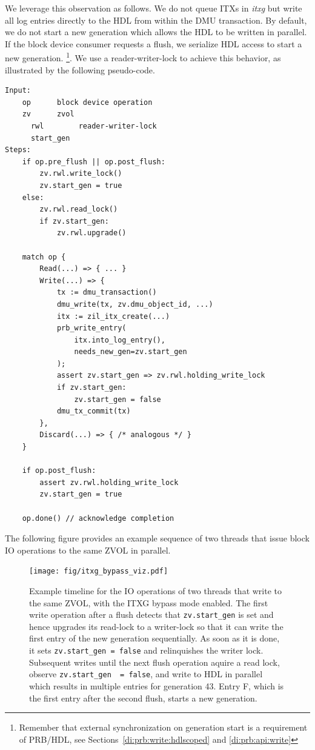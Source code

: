 \documentclass[12pt,a4paper,twoside]{book}
\begin{document}
We leverage this observation as follows.
We do not queue ITXs in \textit{itxg} but write all log entries directly to the HDL from within the DMU transaction.
By default, we do not start a new generation which allows the HDL to be written in parallel.
If the block device consumer requests a flush, we serialize HDL access to start a new generation.%
\footnote{Remember that external synchronization on generation start is a requirement of PRB/HDL, see Sections~\ref{di:prb:write:hdlscoped} and \ref{di:prb:api:write}}.
We use a reader-writer-lock to achieve this behavior, as illustrated by the following pseudo-code.

\begin{lstlisting}[style=figurepseudocode]
Input:
    op      block device operation
    zv      zvol
      rwl        reader-writer-lock
      start_gen
Steps:
    if op.pre_flush || op.post_flush:
        zv.rwl.write_lock()
        zv.start_gen = true
    else:
        zv.rwl.read_lock()
        if zv.start_gen:
            zv.rwl.upgrade()

    match op {
        Read(...) => { ... }
        Write(...) => {
            tx := dmu_transaction()
            dmu_write(tx, zv.dmu_object_id, ...)
            itx := zil_itx_create(...)
            prb_write_entry(
                itx.into_log_entry(),
                needs_new_gen=zv.start_gen
            );
            assert zv.start_gen => zv.rwl.holding_write_lock
            if zv.start_gen:
                zv.start_gen = false
            dmu_tx_commit(tx)
        },
        Discard(...) => { /* analogous */ }
    }

    if op.post_flush:
        assert zv.rwl.holding_write_lock
        zv.start_gen = true

    op.done() // acknowledge completion
\end{lstlisting}

The following figure provides an example sequence of two threads that issue block IO operations to the same ZVOL in parallel.

\begin{figure}
    \centering
    \texttt{[image: fig/itxg\_bypass\_viz.pdf]}
    \caption{Example timeline for the IO operations of two threads that write to the same ZVOL, with the ITXG bypass mode enabled.
        The first write operation after a flush detects that \lstinline{zv.start_gen} is set and hence upgrades its read-lock to a writer-lock so that it can write the first entry of the new generation sequentially.
        As soon as it is done, it sets \lstinline{zv.start_gen = false} and relinquishes the writer lock.
        Subsequent writes until the next flush operation aquire a read lock, observe \lstinline{zv.start_gen  = false}, and write to HDL in parallel which results in multiple entries for generation 43.
        Entry F, which is the first entry after the second flush, starts a new generation.
    }

\end{figure}
\end{document}
